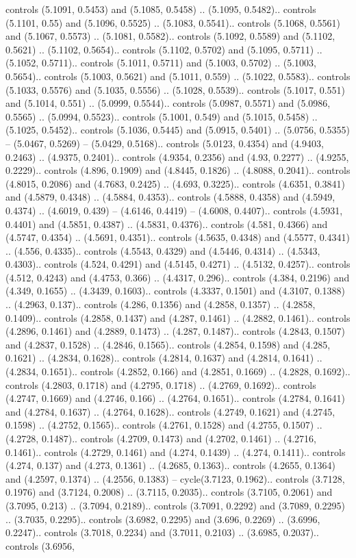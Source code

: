 controls (5.1091, 0.5453) and (5.1085, 0.5458) .. (5.1095, 0.5482).. controls (5.1101, 0.55) and (5.1096, 0.5525) .. (5.1083, 0.5541).. controls (5.1068, 0.5561) and (5.1067, 0.5573) .. (5.1081, 0.5582).. controls (5.1092, 0.5589) and (5.1102, 0.5621) .. (5.1102, 0.5654).. controls (5.1102, 0.5702) and (5.1095, 0.5711) .. (5.1052, 0.5711).. controls (5.1011, 0.5711) and (5.1003, 0.5702) .. (5.1003, 0.5654).. controls (5.1003, 0.5621) and (5.1011, 0.559) .. (5.1022, 0.5583).. controls (5.1033, 0.5576) and (5.1035, 0.5556) .. (5.1028, 0.5539).. controls (5.1017, 0.551) and (5.1014, 0.551) .. (5.0999, 0.5544).. controls (5.0987, 0.5571) and (5.0986, 0.5565) .. (5.0994, 0.5523).. controls (5.1001, 0.549) and (5.1015, 0.5458) .. (5.1025, 0.5452).. controls (5.1036, 0.5445) and (5.0915, 0.5401) .. (5.0756, 0.5355) -- (5.0467, 0.5269) -- (5.0429, 0.5168).. controls (5.0123, 0.4354) and (4.9403, 0.2463) .. (4.9375, 0.2401).. controls (4.9354, 0.2356) and (4.93, 0.2277) .. (4.9255, 0.2229).. controls (4.896, 0.1909) and (4.8445, 0.1826) .. (4.8088, 0.2041).. controls (4.8015, 0.2086) and (4.7683, 0.2425) .. (4.693, 0.3225).. controls (4.6351, 0.3841) and (4.5879, 0.4348) .. (4.5884, 0.4353).. controls (4.5888, 0.4358) and (4.5949, 0.4374) .. (4.6019, 0.439) -- (4.6146, 0.4419) -- (4.6008, 0.4407).. controls (4.5931, 0.4401) and (4.5851, 0.4387) .. (4.5831, 0.4376).. controls (4.581, 0.4366) and (4.5747, 0.4354) .. (4.5691, 0.4351).. controls (4.5635, 0.4348) and (4.5577, 0.4341) .. (4.556, 0.4335).. controls (4.5543, 0.4329) and (4.5446, 0.4314) .. (4.5343, 0.4303).. controls (4.524, 0.4291) and (4.5145, 0.4271) .. (4.5132, 0.4257).. controls (4.512, 0.4243) and (4.4753, 0.366) .. (4.4317, 0.296).. controls (4.384, 0.2196) and (4.349, 0.1655) .. (4.3439, 0.1603).. controls (4.3337, 0.1501) and (4.3107, 0.1388) .. (4.2963, 0.137).. controls (4.286, 0.1356) and (4.2858, 0.1357) .. (4.2858, 0.1409).. controls (4.2858, 0.1437) and (4.287, 0.1461) .. (4.2882, 0.1461).. controls (4.2896, 0.1461) and (4.2889, 0.1473) .. (4.287, 0.1487).. controls (4.2843, 0.1507) and (4.2837, 0.1528) .. (4.2846, 0.1565).. controls (4.2854, 0.1598) and (4.285, 0.1621) .. (4.2834, 0.1628).. controls (4.2814, 0.1637) and (4.2814, 0.1641) .. (4.2834, 0.1651).. controls (4.2852, 0.166) and (4.2851, 0.1669) .. (4.2828, 0.1692).. controls (4.2803, 0.1718) and (4.2795, 0.1718) .. (4.2769, 0.1692).. controls (4.2747, 0.1669) and (4.2746, 0.166) .. (4.2764, 0.1651).. controls (4.2784, 0.1641) and (4.2784, 0.1637) .. (4.2764, 0.1628).. controls (4.2749, 0.1621) and (4.2745, 0.1598) .. (4.2752, 0.1565).. controls (4.2761, 0.1528) and (4.2755, 0.1507) .. (4.2728, 0.1487).. controls (4.2709, 0.1473) and (4.2702, 0.1461) .. (4.2716, 0.1461).. controls (4.2729, 0.1461) and (4.274, 0.1439) .. (4.274, 0.1411).. controls (4.274, 0.137) and (4.273, 0.1361) .. (4.2685, 0.1363).. controls (4.2655, 0.1364) and (4.2597, 0.1374) .. (4.2556, 0.1383) -- cycle(3.7123, 0.1962).. controls (3.7128, 0.1976) and (3.7124, 0.2008) .. (3.7115, 0.2035).. controls (3.7105, 0.2061) and (3.7095, 0.213) .. (3.7094, 0.2189).. controls (3.7091, 0.2292) and (3.7089, 0.2295) .. (3.7035, 0.2295).. controls (3.6982, 0.2295) and (3.696, 0.2269) .. (3.6996, 0.2247).. controls (3.7018, 0.2234) and (3.7011, 0.2103) .. (3.6985, 0.2037).. controls (3.6956, 